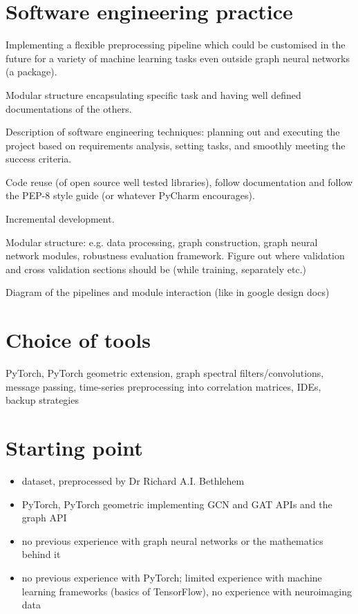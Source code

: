 \section{Software engineering practice}
Implementing a flexible preprocessing pipeline which could be customised in the future for a variety of machine learning tasks even outside graph neural networks (a package).

Modular structure encapsulating specific task and having well defined documentations of the others.

Description of software engineering techniques: planning out and executing the project based on requirements analysis, setting tasks, and smoothly meeting the success criteria.

Code reuse (of open source well tested libraries), follow documentation and follow the PEP-8 style guide (or whatever PyCharm encourages).

Incremental development.

Modular structure: e.g. data processing, graph construction, graph neural network modules, robustness evaluation framework. Figure out where validation and cross validation sections should be (while training, separately etc.)

Diagram of the pipelines and module interaction (like in google design docs)


\section{Choice of tools}
PyTorch, PyTorch geometric extension, graph spectral filters/convolutions, message passing, time-series preprocessing into correlation matrices, IDEs, backup strategies

\section{Starting point}
\begin{itemize}
    \item dataset, preprocessed by Dr Richard A.I. Bethlehem
    \item PyTorch, PyTorch geometric implementing GCN and GAT APIs and the graph API
    \item no previous experience with graph neural networks or the mathematics behind it
    \item no previous experience with PyTorch; limited experience with machine learning frameworks (basics of TensorFlow), no experience with neuroimaging data
\end{itemize}
